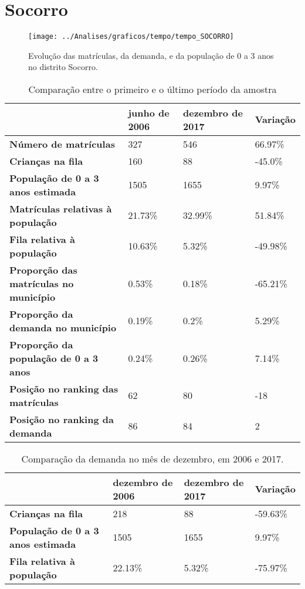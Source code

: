 \section{Socorro}
\begin{figure}[H]
\centering
\texttt{[image: ../Analises/graficos/tempo/tempo\_SOCORRO]}
\caption{Evolução das matrículas, da demanda, e da população de 0 a 3 anos no distrito Socorro.}
\end{figure}
\begin{table}[H]
\begin{tabular}{|l|l|l|l|}
\hline
\textbf{}                                      & \textbf{junho de 2006}       & \textbf{dezembro de 2017}    & \textbf{Variação} \\ \hline
\textbf{Número de matrículas}                  & 327 & 546 & 66.97\% \\ \hline
\textbf{Crianças na fila}                      & 160 & 88 & -45.0\% \\ \hline
\textbf{População de 0 a 3 anos estimada}      & 1505 & 1655 & 9.97\% \\ \hline
\textbf{Matrículas relativas à população}      & 21.73\% & 32.99\% & 51.84\% \\ \hline
\textbf{Fila relativa à população}             & 10.63\% & 5.32\% & -49.98\% \\ \hline
\textbf{Proporção das matrículas no município} & 0.53\% & 0.18\% & -65.21\% \\ \hline
\textbf{Proporção da demanda no município}     & 0.19\% & 0.2\% & 5.29\% \\ \hline
\textbf{Proporção da população de 0 a 3 anos}  & 0.24\% & 0.26\% & 7.14\% \\ \hline
\textbf{Posição no ranking das matrículas}     & 62 & 80 & -18 \\ \hline
\textbf{Posição no ranking da demanda}         & 86 & 84 & 2 \\ \hline
\end{tabular}
\caption{Comparação entre o primeiro e o último período da amostra}
\end{table}
\begin{table}[H]
\begin{tabular}{|l|l|l|l|}
\hline
\textbf{}                                 & \textbf{dezembro de 2006} & \textbf{dezembro de 2017} & \textbf{Variação} \\ \hline
\textbf{Crianças na fila}                      & 218 & 88 & -59.63\% \\ \hline
\textbf{População de 0 a 3 anos estimada}      & 1505 & 1655 & 9.97\% \\ \hline
\textbf{Fila relativa à população}             & 22.13\% & 5.32\% & -75.97\% \\ \hline
\end{tabular}
\caption{Comparação da demanda no mês de dezembro, em 2006 e 2017.}
\end{table}
